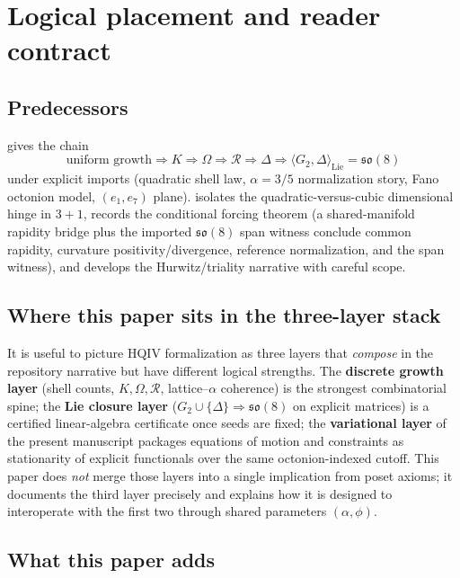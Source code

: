 \documentclass[11pt]{amsart}
\begin{document}
\section{Logical placement and reader contract}
\label{sec:placement}

\subsection{Predecessors}

\cite{hqiv-so8-paper} gives the chain
\[
\text{uniform growth} \Longrightarrow K \Longrightarrow \Omega \Longrightarrow \mathcal{R}
\Longrightarrow \Delta \Longrightarrow \langle G_2,\Delta\rangle_{\mathrm{Lie}}=\mathfrak{so}(8)
\]
under explicit imports (quadratic shell law, \(\alpha=3/5\) normalization story, Fano octonion model, \((e_1,e_7)\) plane). \cite{hqiv-3d-growth-paper} isolates the quadratic-versus-cubic dimensional hinge in \(3{+}1\), records the conditional forcing theorem (a shared-manifold rapidity bridge plus the imported \(\mathfrak{so}(8)\) span witness conclude common rapidity, curvature positivity/divergence, reference normalization, and the span witness), and develops the Hurwitz/triality narrative with careful scope.

\subsection{Where this paper sits in the three-layer stack}

It is useful to picture HQIV formalization as three layers that \emph{compose} in the repository narrative but have different logical strengths. The \textbf{discrete growth layer} (shell counts, \(K,\Omega,\mathcal{R}\), lattice--\(\alpha\) coherence) is the strongest combinatorial spine; the \textbf{Lie closure layer} (\(G_2\cup\{\Delta\}\Rightarrow\mathfrak{so}(8)\) on explicit matrices) is a certified linear-algebra certificate once seeds are fixed; the \textbf{variational layer} of the present manuscript packages equations of motion and constraints as stationarity of explicit functionals over the same octonion-indexed cutoff. This paper does \emph{not} merge those layers into a single implication from poset axioms; it documents the third layer precisely and explains how it is designed to interoperate with the first two through shared parameters \((\alpha,\phi)\).

\subsection{What this paper adds}
\label{subsec:adds}
\end{document}
